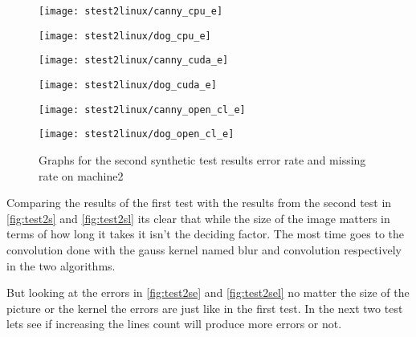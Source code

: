 \begin{figure}[H]
\centering
\begin{minipage}[t]{.49\textwidth}
\centering
\texttt{[image: stest2linux/canny\_cpu\_e]}
\end{minipage}
\begin{minipage}[t]{.49\textwidth}
\centering
\texttt{[image: stest2linux/dog\_cpu\_e]}
\end{minipage}
\begin{minipage}[t]{.49\textwidth}
\centering
\texttt{[image: stest2linux/canny\_cuda\_e]}
\end{minipage}
\begin{minipage}[t]{.49\textwidth}
\centering
\texttt{[image: stest2linux/dog\_cuda\_e]}
\end{minipage}
\begin{minipage}[t]{.49\textwidth}
\centering
\texttt{[image: stest2linux/canny\_open\_cl\_e]}
\end{minipage}
\begin{minipage}[t]{.49\textwidth}
\centering
\texttt{[image: stest2linux/dog\_open\_cl\_e]}
\end{minipage}
\caption{Graphs for the second synthetic test results error rate and missing rate on machine2}
\label{fig:test2sel}
\end{figure}

Comparing the results of the first test with the results from the second test in \autoref{fig:test2s} and \autoref{fig:test2sl} its clear that while the size of the image matters in terms of how long it takes it isn't the deciding factor. The most time goes to the convolution done with the gauss kernel named blur and convolution respectively in the two algorithms.

But looking at the errors in \autoref{fig:test2se} and \autoref{fig:test2sel} no matter the size of the picture or the kernel the errors are just like in the first test. In the next two test lets see if increasing the lines count will produce more errors or not.

